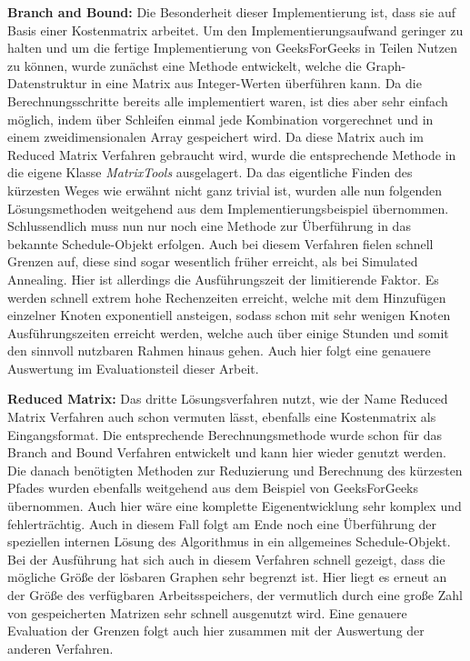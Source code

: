 \textbf{Branch and Bound:} Die Besonderheit dieser Implementierung ist, dass sie auf Basis einer Kostenmatrix arbeitet. Um den Implementierungsaufwand geringer zu halten und um die fertige Implementierung von GeeksForGeeks \cite{geeksForGeeksBnB} in Teilen Nutzen zu können, wurde zunächst eine Methode entwickelt, welche die Graph-Datenstruktur in eine Matrix aus Integer-Werten überführen kann. Da die Berechnungsschritte bereits alle implementiert waren, ist dies aber sehr einfach möglich, indem über Schleifen einmal jede Kombination vorgerechnet und in einem zweidimensionalen Array gespeichert wird. Da diese Matrix auch im Reduced Matrix Verfahren gebraucht wird, wurde die entsprechende Methode in die eigene Klasse \textit{MatrixTools} ausgelagert. Da das eigentliche Finden des kürzesten Weges wie erwähnt nicht ganz trivial ist, wurden alle nun folgenden Lösungsmethoden weitgehend aus dem Implementierungsbeispiel übernommen. Schlussendlich muss nun nur noch eine Methode zur Überführung in das bekannte Schedule-Objekt erfolgen. Auch bei diesem Verfahren fielen schnell Grenzen auf, diese sind sogar wesentlich früher erreicht, als bei Simulated Annealing. Hier ist allerdings die Ausführungszeit der limitierende Faktor. Es werden schnell extrem hohe Rechenzeiten erreicht, welche mit dem Hinzufügen einzelner Knoten exponentiell ansteigen, sodass schon mit sehr wenigen Knoten Ausführungszeiten erreicht werden, welche auch über einige Stunden und somit den sinnvoll nutzbaren Rahmen hinaus gehen. Auch hier folgt eine genauere Auswertung im Evaluationsteil dieser Arbeit.

\textbf{Reduced Matrix:} Das dritte Lösungsverfahren nutzt, wie der Name Reduced Matrix Verfahren auch schon vermuten lässt, ebenfalls eine Kostenmatrix als Eingangsformat. Die entsprechende Berechnungsmethode wurde schon für das Branch and Bound Verfahren entwickelt und kann hier wieder genutzt werden. Die danach benötigten Methoden zur Reduzierung und Berechnung des kürzesten Pfades wurden ebenfalls weitgehend aus dem Beispiel von GeeksForGeeks \cite{geeksForGeeksRm} übernommen. Auch hier wäre eine komplette Eigenentwicklung sehr komplex und fehlerträchtig. Auch in diesem Fall folgt am Ende noch eine Überführung der speziellen internen Lösung des Algorithmus in ein allgemeines Schedule-Objekt. Bei der Ausführung hat sich auch in diesem Verfahren schnell gezeigt, dass die mögliche Größe der lösbaren Graphen sehr begrenzt ist. Hier liegt es erneut an der Größe des verfügbaren Arbeitsspeichers, der vermutlich durch eine große Zahl von gespeicherten Matrizen sehr schnell ausgenutzt wird. Eine genauere Evaluation der Grenzen folgt auch hier zusammen mit der Auswertung der anderen Verfahren.

